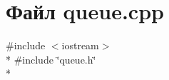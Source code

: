 \section{Файл queue.\+cpp}
\label{queue_8cpp}
{\ttfamily \#include $<$iostream$>$}\\*
{\ttfamily \#include \char`\"{}queue.\+h\char`\"{}}\\*
